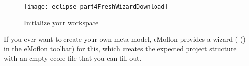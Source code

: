 \begin{figure}[htbp]
\begin{center}
  \texttt{[image: eclipse\_part4FreshWizardDownload]}
  \caption{Initialize your workspace}
  \label{eclipse:downPartIV}
\end{center}
\end{figure} 

If you ever want to create your own meta-model, eMoflon provides a wizard ( (\eMoflonCreateNewRepositoryProjectIcon) in the eMoflon toolbar) for this, which creates the expected project structure with an empty ecore file that you can fill out.

